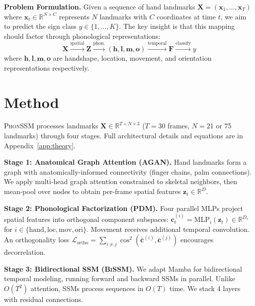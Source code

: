 \documentclass[sigconf,nonacm,anonymous]{acmart}
\theoremstyle{definition}
\theoremstyle{remark}
\newcommand{\phonssm}{\textsc{PhonSSM}}
\newcommand{\agan}{\textsc{AGAN}}
\newcommand{\pdm}{\textsc{PDM}}
\newcommand{\bissm}{\textsc{BiSSM}}
\begin{document}
\textbf{Problem Formulation.}
Given a sequence of hand landmarks $\mathbf{X} = (\mathbf{x}_1, \ldots, \mathbf{x}_T)$ where $\mathbf{x}_t \in \mathbb{R}^{N \times C}$ represents $N$ landmarks with $C$ coordinates at time $t$, we aim to predict the sign class $y \in \{1, \ldots, K\}$. The key insight is that this mapping should factor through phonological representations:
\begin{equation}
\mathbf{X} \xrightarrow{\text{spatial}} \mathbf{Z} \xrightarrow{\text{phon.}} (\mathbf{h}, \mathbf{l}, \mathbf{m}, \mathbf{o}) \xrightarrow{\text{temporal}} \mathbf{F} \xrightarrow{\text{classify}} y
\end{equation}
where $\mathbf{h}, \mathbf{l}, \mathbf{m}, \mathbf{o}$ are handshape, location, movement, and orientation representations respectively.

\FloatBarrier
\section{Method}
\label{sec:method}

\phonssm{} processes landmarks $\mathbf{X} \in \mathbb{R}^{T \times N \times 3}$ ($T{=}30$ frames, $N{=}21$ or 75 landmarks) through four stages. Full architectural details and equations are in Appendix~\ref{app:theory}.

\textbf{Stage 1: Anatomical Graph Attention (\agan{}).} Hand landmarks form a graph with anatomically-informed connectivity (finger chains, palm connections). We apply multi-head graph attention \cite{velivckovic2018graph} constrained to skeletal neighbors, then mean-pool over nodes to obtain per-frame spatial features $\mathbf{z}_t \in \mathbb{R}^{D}$.

\textbf{Stage 2: Phonological Factorization (\pdm{}).} Four parallel MLPs project spatial features into orthogonal component subspaces: $\mathbf{c}_t^{(i)} = \text{MLP}_i(\mathbf{z}_t) \in \mathbb{R}^{D_c}$ for $i \in \{\text{hand}, \text{loc}, \text{mov}, \text{ori}\}$. Movement receives additional temporal convolution. An orthogonality loss $\mathcal{L}_{\text{ortho}} = \sum_{i \neq j} \cos^2(\bar{\mathbf{c}}^{(i)}, \bar{\mathbf{c}}^{(j)})$ encourages decorrelation.

\textbf{Stage 3: Bidirectional SSM (\bissm{}).} We adapt Mamba \cite{gu2023mamba} for bidirectional temporal modeling, running forward and backward SSMs in parallel. Unlike $O(T^2)$ attention, SSMs process sequences in $O(T)$ time. We stack 4 layers with residual connections.
\end{document}
